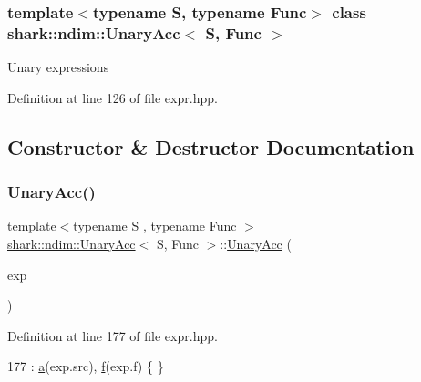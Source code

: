 \subsubsection*{template$<$typename S, typename Func$>$\newline
class shark\+::ndim\+::\+Unary\+Acc$<$ S, Func $>$}

Unary expressions 

Definition at line 126 of file expr.\+hpp.



\subsection{Constructor \& Destructor Documentation}
\hypertarget{classshark_1_1ndim_1_1_unary_acc_a776fc8713e13051d4fb52eeef18c067f}{}\label{classshark_1_1ndim_1_1_unary_acc_a776fc8713e13051d4fb52eeef18c067f} 
\subsubsection{\texorpdfstring{Unary\+Acc()}{UnaryAcc()}}
{\footnotesize\ttfamily template$<$typename S , typename Func $>$ \\
\hyperlink{classshark_1_1ndim_1_1_unary_acc}{shark\+::ndim\+::\+Unary\+Acc}$<$ S, Func $>$\+::\hyperlink{classshark_1_1ndim_1_1_unary_acc}{Unary\+Acc} (\begin{DoxyParamCaption}\item[{const \hyperlink{classshark_1_1ndim_1_1_unary_exp}{Unary\+Exp}$<$ S, Func $>$ \&}]{exp }\end{DoxyParamCaption})}



Definition at line 177 of file expr.\+hpp.


\begin{DoxyCode}
177 : \hyperlink{classshark_1_1ndim_1_1_unary_acc_af254b8e0cfc968269a4e03d80f45a4eb}{a}(exp.src), \hyperlink{classshark_1_1ndim_1_1_unary_acc_a8a6488ae3b1f64726413bd49721e05b3}{f}(exp.f) \{ \}
\end{DoxyCode}
\hypertarget{classshark_1_1ndim_1_1_unary_acc_a4069b14973b6098c878dd467d695f7a7}{}\label{classshark_1_1ndim_1_1_unary_acc_a4069b14973b6098c878dd467d695f7a7} 
